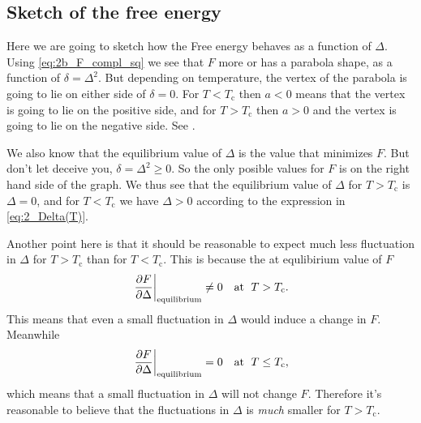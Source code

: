 \documentclass[11pt,letter, swedish, english
]{article}
\newcommand{\Tc}{\ensuremath{T_{\text{c}}}}
\begin{document}
\subsection{Sketch of the free energy}
Here we are going to sketch how the Free energy behaves as a function
of $\Delta$.
Using \eqref{eq:2b_F_compl_sq} we see that $F$ more or has a
parabola shape, as a function of $\delta=\Delta^2$. But depending on
temperature, the vertex of the parabola is going to lie on either side
of $\delta=0$. For $T<\Tc$ then $a<0$ means that the vertex is going
to lie on the positive side, and for $T>\Tc$ then $a>0$ and the vertex
is going to lie on the negative side. See .


We also know that the equilibrium value of $\Delta$ is the value that
minimizes $F$. But don't let  deceive you,
$\delta=\Delta^2\ge0$. So the only posible values for $F$ is on the
right hand side of the graph. 
We thus see that the equilibrium value of $\Delta$ for $T>\Tc$ is
$\Delta=0$, and for $T<\Tc$ we have $\Delta>0$ according to the
expression in \eqref{eq:2_Delta(T)}.

Another point here is that it should be reasonable to expect much less
fluctuation in $\Delta$ for $T>\Tc$ than for $T<\Tc$. This is because
the at equlibirium value of $F$ 
\begin{equation}
\eval{\pdv{F}{\Delta}}_{\text{equilibrium}}\neq0\quad\text{at }\;T>\Tc.
\end{equation}
This means that even a small fluctuation in $\Delta$ would induce a
change in $F$. Meanwhile
\begin{equation}
\eval{\pdv{F}{\Delta}}_{\text{equilibrium}}=0\quad\text{at }\;T\le\Tc,
\end{equation}
which means that a small fluctuation in $\Delta$ will not change
$F$. Therefore it's reasonable to believe that the fluctuations in
$\Delta$ is \emph{much} smaller for $T>\Tc$.



\begin{figure}
\centering
\resizebox{.7\textwidth}{!}{}
\caption{}
\label{fig:2_F}
\end{figure}
\end{document}
